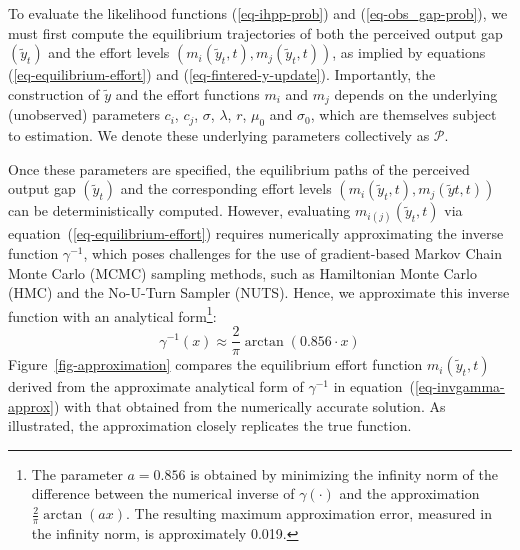 \documentclass[mnsc]{informs3}
\begin{document}
To evaluate the likelihood functions (\ref{eq-ihpp-prob}) and (\ref{eq-obs_gap-prob}), we must first compute the equilibrium trajectories of both the perceived output gap $(\tilde{y}_t)$ and the effort levels $(m_i(\tilde{y}_t, t), m_j(\tilde{y}_t, t))$, as implied by equations (\ref{eq-equilibrium-effort}) and (\ref{eq-fintered-y-update}). 
Importantly, the construction of $\tilde{y}$ and the effort functions $m_i$ and $m_j$ depends on the underlying (unobserved) parameters $c_i$, $c_j$, $\sigma$, $\lambda$, $r$, $\mu_0$ and $\sigma_0$, which are themselves subject to estimation.
We denote these underlying parameters collectively as $\mathcal{P}$. 

Once these parameters are specified, the equilibrium paths of the perceived output gap $(\tilde{y}_t)$ and the corresponding effort levels $(m_i(\tilde{y}_t, t), m_j(\tilde{y}t, t))$ can be deterministically computed. 
However, evaluating $m_{i(j)}(\tilde{y}_t, t)$ via equation~(\ref{eq-equilibrium-effort}) requires numerically approximating the inverse function $\gamma^{-1}$, which poses challenges for the use of gradient-based Markov Chain Monte Carlo (MCMC) sampling methods, such as Hamiltonian Monte Carlo (HMC) and the No-U-Turn Sampler (NUTS).
Hence, we approximate this inverse function with an analytical form\footnote{The parameter $a = 0.856$ is obtained by minimizing the infinity norm of the difference between the numerical inverse of $\gamma(\cdot)$ and the approximation $\frac{2}{\pi} \arctan(a x)$.
The resulting maximum approximation error, measured in the infinity norm, is approximately 0.019.}:
\begin{equation}\label{eq-invgamma-approx}
\gamma^{-1}(x) \approx \frac{2}{\pi}\arctan(0.856 \cdot x)
\end{equation}
Figure~\ref{fig-approximation} compares the equilibrium effort function $m_i(\tilde{y}_t, t)$ derived from the approximate analytical form of $\gamma^{-1}$ in equation~(\ref{eq-invgamma-approx}) with that obtained from the numerically accurate solution.
As illustrated, the approximation closely replicates the true function.
\end{document}
